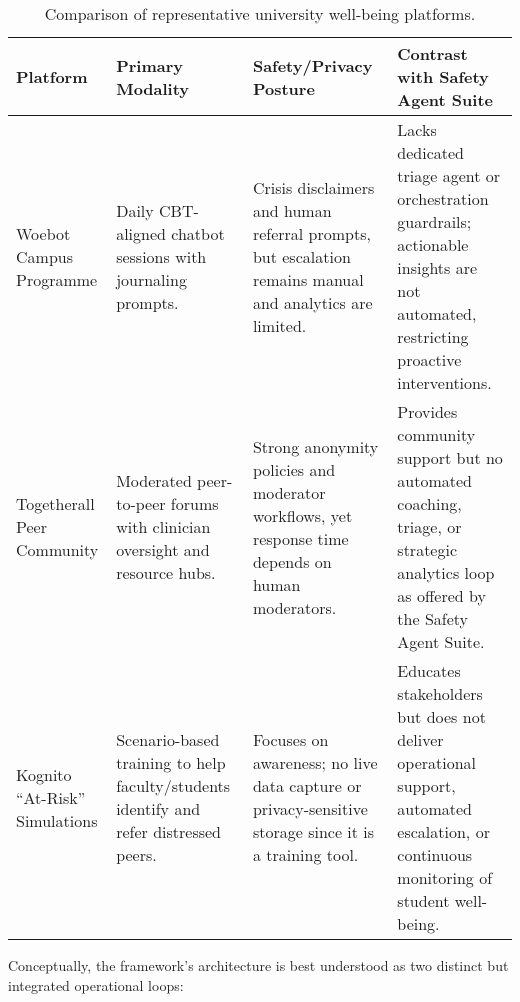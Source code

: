 \begin{table}[h]
    \centering
    \caption{Comparison of representative university well-being platforms.}
    \label{tab:wellbeing_comparison}
    \begin{tabular}{p{3.4cm}p{3.6cm}p{3.6cm}p{3.6cm}}
        \toprule
        \textbf{Platform} & \textbf{Primary Modality} & \textbf{Safety/Privacy Posture} & \textbf{Contrast with Safety Agent Suite} \\
        \midrule
        Woebot Campus Programme\cite{FIND_CITATION_PLACEHOLDER} & Daily CBT-aligned chatbot sessions with journaling prompts. & Crisis disclaimers and human referral prompts, but escalation remains manual and analytics are limited. & Lacks dedicated triage agent or orchestration guardrails; actionable insights are not automated, restricting proactive interventions. \\
        Togetherall Peer Community\cite{FIND_CITATION_PLACEHOLDER} & Moderated peer-to-peer forums with clinician oversight and resource hubs. & Strong anonymity policies and moderator workflows, yet response time depends on human moderators. & Provides community support but no automated coaching, triage, or strategic analytics loop as offered by the Safety Agent Suite. \\
        Kognito ``At-Risk'' Simulations\cite{FIND_CITATION_PLACEHOLDER} & Scenario-based training to help faculty/students identify and refer distressed peers. & Focuses on awareness; no live data capture or privacy-sensitive storage since it is a training tool. & Educates stakeholders but does not deliver operational support, automated escalation, or continuous monitoring of student well-being. \\
        \bottomrule
    \end{tabular}
\end{table}

Conceptually, the framework's architecture is best understood as two distinct but integrated operational loops:

